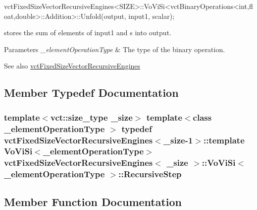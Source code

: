 \begin{DoxyPre}vctFixedSizeVectorRecursiveEngines<SIZE>::VoViSi<vctBinaryOperations<int,float,double>::Addition>::Unfold(output, input1, scalar);
\end{DoxyPre}
 stores the sum of elements of input1 and s into output.


\begin{DoxyParams}{Parameters}
{\em \+\_\+element\+Operation\+Type} & The type of the binary operation.\\
\hline
\end{DoxyParams}
\begin{DoxySeeAlso}{See also}
\hyperlink{classvct_fixed_size_vector_recursive_engines}{vct\+Fixed\+Size\+Vector\+Recursive\+Engines} 
\end{DoxySeeAlso}


\subsection{Member Typedef Documentation}
\hypertarget{classvct_fixed_size_vector_recursive_engines_1_1_vo_vi_si_accec4105549a16640771c23dad79ac30}{}
\subsubsection[{Recursive\+Step}]{\setlength{\rightskip}{0pt plus 5cm}template$<$vct\+::size\+\_\+type \+\_\+size$>$ template$<$class \+\_\+element\+Operation\+Type $>$ typedef {\bf vct\+Fixed\+Size\+Vector\+Recursive\+Engines}$<$\+\_\+size-\/1$>$\+::template {\bf Vo\+Vi\+Si}$<$\+\_\+element\+Operation\+Type$>$ {\bf vct\+Fixed\+Size\+Vector\+Recursive\+Engines}$<$ \+\_\+size $>$\+::{\bf Vo\+Vi\+Si}$<$ \+\_\+element\+Operation\+Type $>$\+::{\bf Recursive\+Step}}\label{classvct_fixed_size_vector_recursive_engines_1_1_vo_vi_si_accec4105549a16640771c23dad79ac30}


\subsection{Member Function Documentation}
\hypertarget{classvct_fixed_size_vector_recursive_engines_1_1_vo_vi_si_a77d53351e3af513b9aab368e14ca65ea}{}
